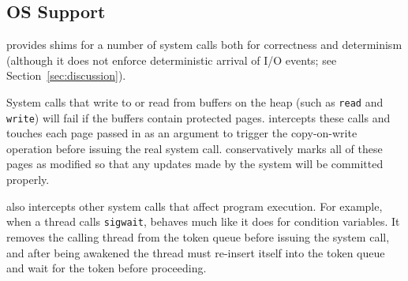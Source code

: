 \subsection{OS Support}

\dthreads{} provides shims for a number of system calls both for
correctness and determinism (although it does not enforce
deterministic arrival of I/O events; see
Section~\ref{sec:discussion}).

System calls that write to or read from buffers on the heap (such
as \texttt{read} and \texttt{write}) will fail if the buffers contain
protected pages. \dthreads{} intercepts these calls and touches each
page passed in as an argument to trigger the copy-on-write operation before issuing the real system
call. \dthreads{} conservatively marks all of these pages as modified
so that any updates made by the system will be committed properly.

\dthreads{} also intercepts other system calls that affect
program execution. For example, when a thread
calls \texttt{sigwait}, \dthreads{} behaves much like it does for
condition variables. It removes the calling thread from the token
queue before issuing the system call, and after being awakened the
thread must re-insert itself into the token queue and wait for the token before proceeding.

